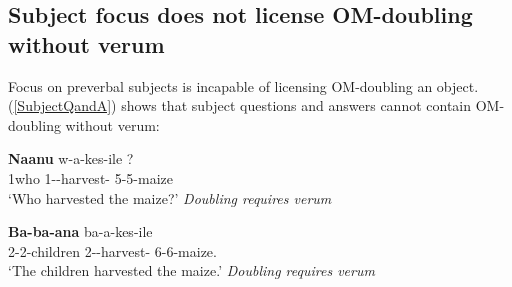 \documentclass[output=paper]{langscibook}
\begin{document}







\subsection{Subject focus does not license OM-doubling without verum}


Focus on preverbal subjects is incapable of licensing OM-doubling an object. (\ref{SubjectQandA}) shows that subject questions and answers cannot contain OM-doubling without verum:

\ea \label{SubjectQandA}
\begin{xlist}

\gll \textbf{Naanu} w-a-kes-ile ? \\
1who 1\Sm-\Om-harvest-\Pfv{} 5-5-maize \\
\glt `Who harvested the maize?’ \textit{Doubling requires verum}

 \label{NoSubjFocusForDoubling}
\gll \textbf{Ba-ba-ana} ba-a-kes-ile  \\
2-2-children 2\Sm-\Om-harvest-\Pfv{} 6-6-maize. \\
\glt `The children harvested the maize.' \textit{Doubling requires verum}

\end{xlist}
\z
\end{document}
